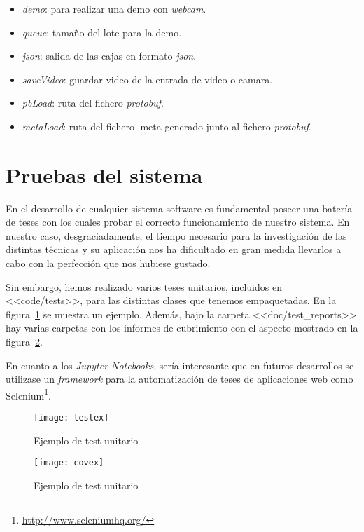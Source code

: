 \begin{itemize}
	\item \textit{demo}: para realizar una demo con \textit{webcam}.
	\item \textit{queue}: tamaño del lote para la demo.
	\item \textit{json}: salida de las cajas en formato \textit{json}.
	\item \textit{saveVideo}: guardar video de la entrada de video o camara.
	\item \textit{pbLoad}: ruta del fichero \textit{protobuf}.
	\item \textit{metaLoad}: ruta del fichero .meta generado junto al fichero \textit{protobuf}.
\end{itemize}

\section{Pruebas del sistema}

En el desarrollo de cualquier sistema software es fundamental poseer una batería de teses con los cuales probar el correcto funcionamiento de nuestro sistema. En nuestro caso, desgraciadamente, el tiempo necesario para la investigación de las distintas técnicas y su aplicación nos ha dificultado en gran medida llevarlos a cabo con la perfección que nos hubiese gustado.

Sin embargo, hemos realizado varios teses unitarios, incluidos en <<code/tests>>, para las distintas clases que tenemos empaquetadas. En la figura~\ref{fig:D.1} se muestra un ejemplo. Además, bajo la carpeta <<doc/test\_reports>> hay varias carpetas con los informes de cubrimiento con el aspecto mostrado en la figura~\ref{fig:D.2}.

En cuanto a los \textit{Jupyter Notebooks}, sería interesante que en futuros desarrollos se utilizase un \textit{framework} para la automatización de teses de aplicaciones web como Selenium\footnote{\url{http://www.seleniumhq.org/}}.

\begin{figure}
\centering
\texttt{[image: testex]}
\caption{Ejemplo de test unitario}
\label{fig:D.1}
\end{figure}

\begin{figure}
\centering
\texttt{[image: covex]}
\caption{Ejemplo de test unitario}
\label{fig:D.2}
\end{figure}